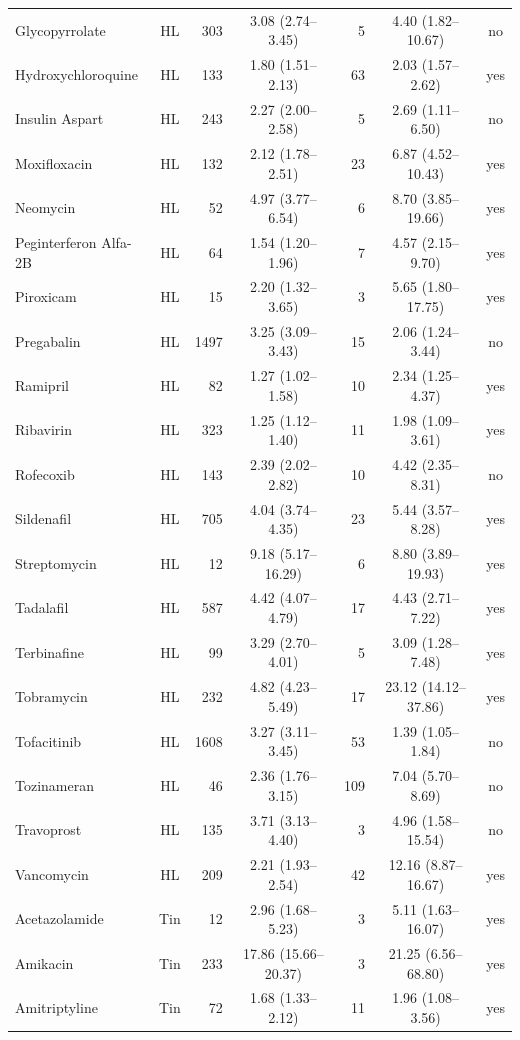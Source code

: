 \documentclass[10pt]{article}
\begin{document}
{\begin{longtable}{lcrcrcc}
Glycopyrrolate & HL & 303 & 3.08 (2.74--3.45) & 5 & 4.40 (1.82--10.67) & no \\
Hydroxychloroquine & HL & 133 & 1.80 (1.51--2.13) & 63 & 2.03 (1.57--2.62) & yes \\
Insulin Aspart & HL & 243 & 2.27 (2.00--2.58) & 5 & 2.69 (1.11--6.50) & no \\
Moxifloxacin & HL & 132 & 2.12 (1.78--2.51) & 23 & 6.87 (4.52--10.43) & yes \\
Neomycin & HL & 52 & 4.97 (3.77--6.54) & 6 & 8.70 (3.85--19.66) & yes \\
Peginterferon Alfa-2B & HL & 64 & 1.54 (1.20--1.96) & 7 & 4.57 (2.15--9.70) & yes \\
Piroxicam & HL & 15 & 2.20 (1.32--3.65) & 3 & 5.65 (1.80--17.75) & yes \\
Pregabalin & HL & 1497 & 3.25 (3.09--3.43) & 15 & 2.06 (1.24--3.44) & no \\
Ramipril & HL & 82 & 1.27 (1.02--1.58) & 10 & 2.34 (1.25--4.37) & yes \\
Ribavirin & HL & 323 & 1.25 (1.12--1.40) & 11 & 1.98 (1.09--3.61) & yes \\
Rofecoxib & HL & 143 & 2.39 (2.02--2.82) & 10 & 4.42 (2.35--8.31) & no \\
Sildenafil & HL & 705 & 4.04 (3.74--4.35) & 23 & 5.44 (3.57--8.28) & yes \\
Streptomycin & HL & 12 & 9.18 (5.17--16.29) & 6 & 8.80 (3.89--19.93) & yes \\
Tadalafil & HL & 587 & 4.42 (4.07--4.79) & 17 & 4.43 (2.71--7.22) & yes \\
Terbinafine & HL & 99 & 3.29 (2.70--4.01) & 5 & 3.09 (1.28--7.48) & yes \\
Tobramycin & HL & 232 & 4.82 (4.23--5.49) & 17 & 23.12 (14.12--37.86) & yes \\
Tofacitinib & HL & 1608 & 3.27 (3.11--3.45) & 53 & 1.39 (1.05--1.84) & no \\
Tozinameran & HL & 46 & 2.36 (1.76--3.15) & 109 & 7.04 (5.70--8.69) & no \\
Travoprost & HL & 135 & 3.71 (3.13--4.40) & 3 & 4.96 (1.58--15.54) & no \\
Vancomycin & HL & 209 & 2.21 (1.93--2.54) & 42 & 12.16 (8.87--16.67) & yes \\
Acetazolamide & Tin & 12 & 2.96 (1.68--5.23) & 3 & 5.11 (1.63--16.07) & yes \\
Amikacin & Tin & 233 & 17.86 (15.66--20.37) & 3 & 21.25 (6.56--68.80) & yes \\
Amitriptyline & Tin & 72 & 1.68 (1.33--2.12) & 11 & 1.96 (1.08--3.56) & yes \\

\end{longtable}}
\end{document}
